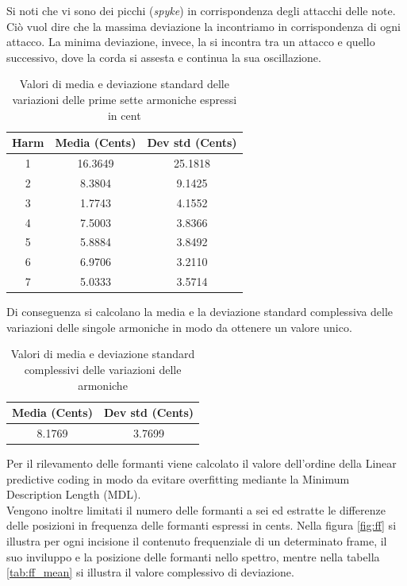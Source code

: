 \documentclass[12pt]{report}
\begin{document}
Si noti che vi sono dei picchi ({\itshape spyke}) in corrispondenza degli attacchi delle note. Ciò vuol dire che la massima deviazione la incontriamo in corrispondenza di ogni attacco. La minima deviazione, invece, la si incontra tra un attacco e quello successivo, dove la corda si assesta e continua la sua oscillazione.

\clearpage

\begin{table}[htbp]
\begin{center}
\begin{tabular}{|c|c|c|}
\hline
Harm & Media (Cents) & Dev std (Cents)\\
\hline
1 & 16.3649 & 25.1818\\
2 & 8.3804 & 9.1425\\
3 & 1.7743 & 4.1552\\
4 & 7.5003 & 3.8366\\
5 & 5.8884 & 3.8492\\
6 & 6.9706 & 3.2110\\
7 & 5.0333 & 3.5714\\
\hline
\end{tabular}
\end{center}
\caption{Valori di media e deviazione standard delle variazioni delle prime sette armoniche espressi in cent}
\label{tab:diff_harm}
\end{table}
Di conseguenza si calcolano la media e la deviazione standard complessiva delle variazioni delle singole armoniche in modo da ottenere un valore unico.

\begin{table}[htbp]
\begin{center}
\begin{tabular}{|c|c|}
\hline
Media (Cents) & Dev std (Cents)\\
\hline
8.1769 & 3.7699\\
\hline
\end{tabular}
\end{center}
\caption{Valori di media e deviazione standard complessivi delle variazioni delle armoniche}
\label{tab:harm_mean}
\end{table}

\clearpage

Per il rilevamento delle formanti viene calcolato il valore dell'ordine della Linear predictive coding in modo da evitare overfitting mediante la Minimum Description Length (MDL)\cite{mdl}.\\
Vengono inoltre limitati il numero delle formanti a sei ed estratte le differenze delle posizioni in frequenza delle formanti espressi in cents.
Nella figura \ref{fig:ff} si illustra per ogni incisione il contenuto frequenziale di un determinato frame, il suo inviluppo e la posizione delle formanti nello spettro, mentre nella tabella \ref{tab:ff_mean} si illustra il valore complessivo di deviazione.
\end{document}
